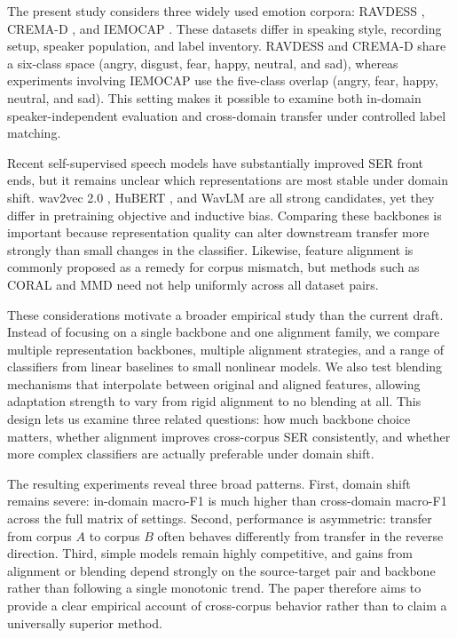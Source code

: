 ﻿\documentclass[10pt,twocolumn,letterpaper]{article}
\begin{document}
The present study considers three widely used emotion corpora: RAVDESS \cite{livingstone2018ryerson}, CREMA-D \cite{cao2014crema}, and IEMOCAP \cite{busso2008iemocap}. These datasets differ in speaking style, recording setup, speaker population, and label inventory. RAVDESS and CREMA-D share a six-class space (angry, disgust, fear, happy, neutral, and sad), whereas experiments involving IEMOCAP use the five-class overlap (angry, fear, happy, neutral, and sad). This setting makes it possible to examine both in-domain speaker-independent evaluation and cross-domain transfer under controlled label matching.

Recent self-supervised speech models have substantially improved SER front ends, but it remains unclear which representations are most stable under domain shift. wav2vec 2.0 \cite{baevski2020wav2vec}, HuBERT \cite{hsu2021hubert}, and WavLM \cite{chen2022wavlm} are all strong candidates, yet they differ in pretraining objective and inductive bias. Comparing these backbones is important because representation quality can alter downstream transfer more strongly than small changes in the classifier. Likewise, feature alignment is commonly proposed as a remedy for corpus mismatch, but methods such as CORAL \cite{sun2016deep} and MMD \cite{gretton2012kernel} need not help uniformly across all dataset pairs.

These considerations motivate a broader empirical study than the current draft. Instead of focusing on a single backbone and one alignment family, we compare multiple representation backbones, multiple alignment strategies, and a range of classifiers from linear baselines to small nonlinear models. We also test blending mechanisms that interpolate between original and aligned features, allowing adaptation strength to vary from rigid alignment to no blending at all. This design lets us examine three related questions: how much backbone choice matters, whether alignment improves cross-corpus SER consistently, and whether more complex classifiers are actually preferable under domain shift.

The resulting experiments reveal three broad patterns. First, domain shift remains severe: in-domain macro-F1 is much higher than cross-domain macro-F1 across the full matrix of settings. Second, performance is asymmetric: transfer from corpus $A$ to corpus $B$ often behaves differently from transfer in the reverse direction. Third, simple models remain highly competitive, and gains from alignment or blending depend strongly on the source-target pair and backbone rather than following a single monotonic trend. The paper therefore aims to provide a clear empirical account of cross-corpus behavior rather than to claim a universally superior method.
\end{document}
